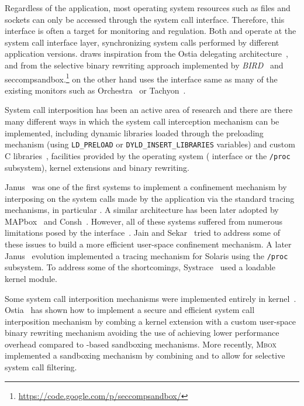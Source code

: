 Regardless of the application, most operating system resources such as files
and sockets can only be accessed through the system call interface.  Therefore,
this interface is often a target for monitoring and regulation. Both \varan and
\mx operate at the system call interface layer, synchronizing system calls
performed by different application versions. \varan draws inspiration from the
Ostia delegating architecture~\cite{ostia}, and from the selective binary
rewriting approach implemented by \emph{BIRD}~\cite{bird} and
\textsf{seccompsandbox}.\footnote{\url{https://code.google.com/p/seccompsandbox/}}
\mx on the other hand uses the \ptrace interface same as many of the existing
monitors such as Orchestra~\cite{orchestra09} or Tachyon~\cite{tachyon12}.

System call interposition has been an active area of research and there are
there many different ways in which the system call interception mechanism can
be implemented, including dynamic libraries loaded through the preloading
mechanism (\ie using \lstinline`LD_PRELOAD` or
\lstinline`DYLD_INSERT_LIBRARIES` variables) and custom C
libraries~\cite{plash}, facilities provided by the operating system (\ie
\ptrace interface or the \lstinline`/proc` subsystem), kernel extensions and binary
rewriting.

Janus~\cite{wily-hacker} was one of the first systems to implement a confinement
mechanism by interposing on the system calls made by the application via the
standard tracing mechanisms, in particular \ptrace. A similar architecture
has been later adopted by MAPbox~\cite{mapbox} and Consh~\cite{consh}. However,
all of these systems suffered from numerous limitations posed by the \ptrace
interface~\cite{janus}. Jain and Sekar~\cite{jain1999} tried to address some of
these issues to build a more efficient user-space confinement mechanism.  A
later Janus~\cite{janus} evolution implemented a tracing mechanism for Solaris
using the \lstinline`/proc` subsystem. To address some of the \ptrace shortcomings,
Systrace~\cite{provos2002} used a loadable kernel module.

Some system call interposition mechanisms were implemented entirely in
kernel~\cite{subdomain,cots-hardening}. Ostia~\cite{ostia} has shown how to
implement a secure and efficient system call interposition mechanism by combing
a kernel extension with a custom user-space binary rewriting mechanism avoiding
the use of \ptrace achieving lower performance overhead compared to
\ptrace-based sandboxing mechanisms. More recently, \textsc{Mbox}~\cite{mbox}
implemented a sandboxing mechanism by combining \ptrace and \seccompbpf to
allow for selective system call filtering.


